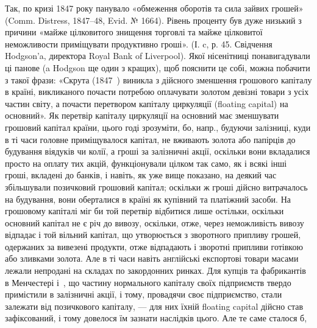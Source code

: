Так, по кризі 1847 року панувало «обмеження оборотів та сила зайвих
грошей» (Comm. Distress, 1847--48, Evid. № 1664). Рівень проценту був дуже
низький з причини «майже цілковитого знищення торговлі та майже цілковитої
неможливости приміщувати продуктивно гроші». (І. c, р. 45. Свідчення Hodgson’a,
директора Royal Bank of Liverpool). Якої нісенітниці понавигадували ці панове
(a Hodgson ще один з кращих), щоб пояснити це собі, можна побачити з такої
фрази: «Скрута (1847~) виникла з дійсного зменшення грошового капіталу
в країні, викликаного почасти потребою оплачувати золотом девізні товари
з усіх частин світу, а почасти перетвором капіталу циркуляції (floating capital)
на основний». Як перетвір капіталу циркуляції на основний має зменшувати
грошовий капітал країни, цього годі зрозуміти, бо, напр., будуючи залізниці,
куди в ті часи головне приміщувалося капітал, не вживають золота або папірців
до будування віядуків чи колії, а гроші за залізничні акції, оскільки вони
вкладалися просто на оплату тих акцій, функціонували цілком так само, як
і всякі інші гроші, вкладені до банків, і навіть, як уже вище показано, на
деякий час збільшували позичковий грошовий капітал; оскільки ж гроші дійсно
витрачалось на будування, вони оберталися в країні як купівний та платіжний
засоби. На грошовому капіталі міг би той перетвір відбитися лише остільки,
оскільки основний капітал не є річ до вивозу, оскільки, отже, через неможливість
вивозу відпадає і той вільний капітал, що утворюється з зворотного припливу грошей,
одержаних за вивезені продукти, отже відпадають і зворотні припливи готівкою
або зливками золота. Але в ті часи навіть англійські експортові товари масами
лежали непродані на складах по закордонних ринках. Для купців та фабрикантів
в Менчестері і~, що частину нормального капіталу своїх підприємств твердо
примістили в залізничні акції, і тому, провадячи своє підприємство, стали
залежати від позичкового капіталу, — для них їхній floating capital дійсно став
зафіксований, і тому довелося їм зазнати наслідків цього. Але те саме сталося б,
\parbreak{}  %
